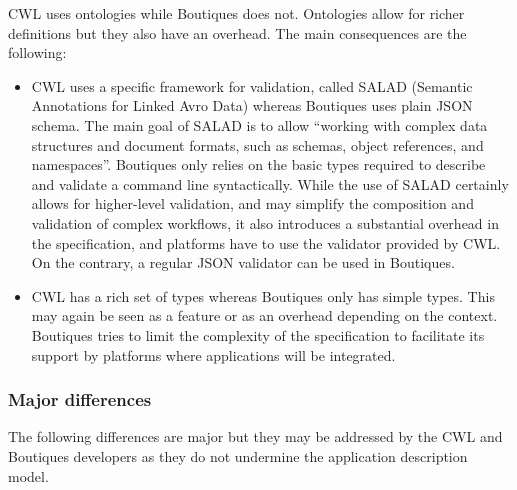 \documentclass[a4paper,num-refs]{oup-contemporary}
\newcommand{\boutiques}{Boutiques\xspace}
\begin{document}
CWL uses ontologies while \boutiques does not. Ontologies allow for
richer definitions but they also have an overhead. The main
consequences are the following:
\begin{itemize}
\item CWL uses a specific framework for
validation, called SALAD (Semantic Annotations for Linked Avro Data)
whereas \boutiques uses plain JSON schema. The main goal of SALAD is to
allow ``working with complex data structures and document formats, such
as schemas, object references, and namespaces''. \boutiques only relies
on the basic types required to describe and validate a command line
syntactically. While the use of SALAD certainly allows for
higher-level validation, and may simplify the composition and
validation of complex workflows, it also introduces a substantial
overhead in the specification, and platforms have to use the validator
provided by CWL. On the contrary, a regular JSON validator can be used in \boutiques.
\item  CWL has a rich set of types whereas \boutiques only has simple
types. This may again be seen as a feature or as an overhead
depending on the context. \boutiques tries to limit the complexity of
the specification to facilitate its support by platforms where applications
will be integrated.
\end{itemize}

\subsubsection{Major differences}

The following differences are major but they may be addressed by the
CWL and \boutiques developers as they do not undermine the application
description model.
\end{document}
